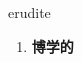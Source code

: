 
\begin{frame}
{\huge erudite}
\begin{center}
\begin{enumerate}\Large
  \item \textbf{博学的}
\end{enumerate}
\end{center}
\end{frame}
